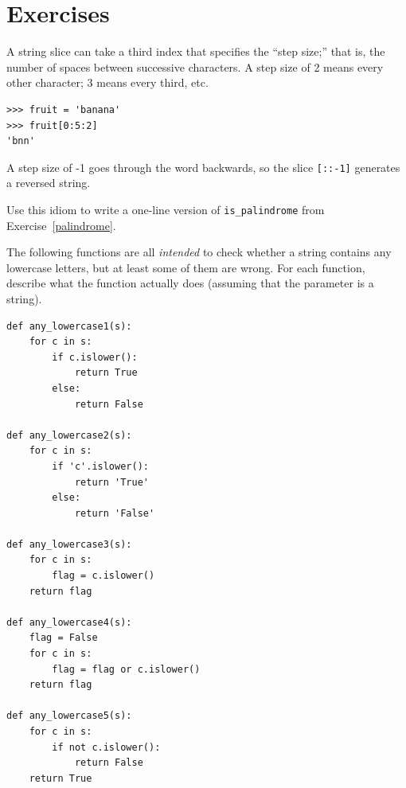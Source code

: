 \documentclass[10pt]{book}
\begin{document}
\section{Exercises}

\begin{exercise}

A string slice can take a third index that specifies the ``step
size;'' that is, the number of spaces between successive characters.
A step size of 2 means every other character; 3 means every third,
etc.

\begin{verbatim}
>>> fruit = 'banana'
>>> fruit[0:5:2]
'bnn'
\end{verbatim}

A step size of -1 goes through the word backwards, so
the slice \verb"[::-1]" generates a reversed string.

Use this idiom to write a one-line version of \verb"is_palindrome"
from Exercise~\ref{palindrome}.
\end{exercise}


\begin{exercise}

The following functions are all {\em intended} to check whether a
string contains any lowercase letters, but at least some of them are
wrong.  For each function, describe what the function actually does
(assuming that the parameter is a string).

\begin{verbatim}
def any_lowercase1(s):
    for c in s:
        if c.islower():
            return True
        else:
            return False

def any_lowercase2(s):
    for c in s:
        if 'c'.islower():
            return 'True'
        else:
            return 'False'

def any_lowercase3(s):
    for c in s:
        flag = c.islower()
    return flag

def any_lowercase4(s):
    flag = False
    for c in s:
        flag = flag or c.islower()
    return flag

def any_lowercase5(s):
    for c in s:
        if not c.islower():
            return False
    return True
\end{verbatim}

\end{exercise}
\end{document}
